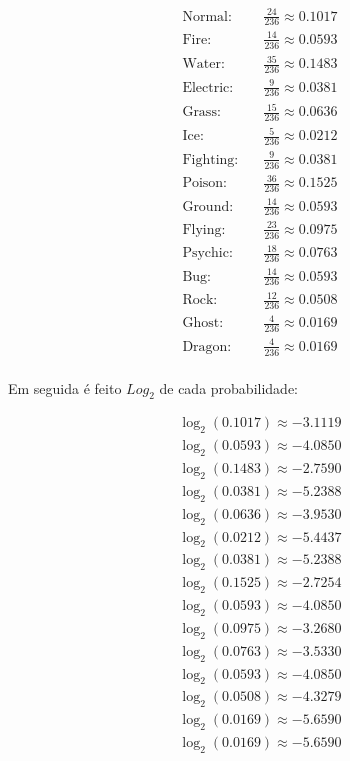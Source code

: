 \documentclass[a4paper,12pt]{article}
\begin{document}
\begin{align*}
\text{Normal:} & \quad \frac{24}{236} \approx 0.1017 \\
\text{Fire:} & \quad \frac{14}{236} \approx 0.0593 \\
\text{Water:} & \quad \frac{35}{236} \approx 0.1483 \\
\text{Electric:} & \quad \frac{9}{236} \approx 0.0381 \\
\text{Grass:} & \quad \frac{15}{236} \approx 0.0636 \\
\text{Ice:} & \quad \frac{5}{236} \approx 0.0212 \\
\text{Fighting:} & \quad \frac{9}{236} \approx 0.0381 \\
\text{Poison:} & \quad \frac{36}{236} \approx 0.1525 \\
\text{Ground:} & \quad \frac{14}{236} \approx 0.0593 \\
\text{Flying:} & \quad \frac{23}{236} \approx 0.0975 \\
\text{Psychic:} & \quad \frac{18}{236} \approx 0.0763 \\
\text{Bug:} & \quad \frac{14}{236} \approx 0.0593 \\
\text{Rock:} & \quad \frac{12}{236} \approx 0.0508 \\
\text{Ghost:} & \quad \frac{4}{236} \approx 0.0169 \\
\text{Dragon:} & \quad \frac{4}{236} \approx 0.0169 \\
\end{align*}

\pagebreak

Em seguida é feito $Log_2$ de cada probabilidade:

\begin{align*}
\log_{2}(0.1017) \approx -3.1119 \\
\log_{2}(0.0593) \approx -4.0850 \\
\log_{2}(0.1483) \approx -2.7590 \\
\log_{2}(0.0381) \approx -5.2388 \\
\log_{2}(0.0636) \approx -3.9530 \\
\log_{2}(0.0212) \approx -5.4437 \\
\log_{2}(0.0381) \approx -5.2388 \\
\log_{2}(0.1525) \approx -2.7254 \\
\log_{2}(0.0593) \approx -4.0850 \\
\log_{2}(0.0975) \approx -3.2680 \\
\log_{2}(0.0763) \approx -3.5330 \\
\log_{2}(0.0593) \approx -4.0850 \\
\log_{2}(0.0508) \approx -4.3279 \\
\log_{2}(0.0169) \approx -5.6590 \\
\log_{2}(0.0169) \approx -5.6590 \\
\end{align*}
\end{document}
